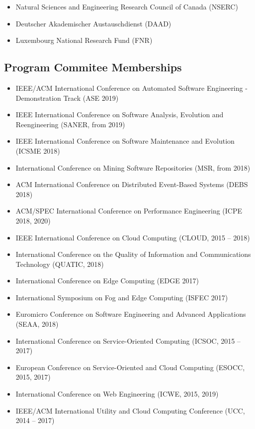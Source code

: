 \documentclass[paper=letter,fontsize=11pt]{scrartcl} %
\begin{document}
\begin{itemize}
  \item Natural Sciences and Engineering Research Council of Canada (NSERC)
	\item Deutscher Akademischer Austauschdienst (DAAD)
	\item Luxembourg National Research Fund (FNR)
\end{itemize}

\subsection*{Program Commitee Memberships}
\begin{itemize}
	\item IEEE/ACM International Conference on Automated Software Engineering - Demonstration Track (ASE 2019)
	\item IEEE International Conference on Software Analysis, Evolution and Reengineering (SANER, from 2019)
	\item IEEE International Conference on Software Maintenance and Evolution (ICSME 2018)
	\item International Conference on Mining Software Repositories (MSR, from 2018)
  \item ACM International Conference on Distributed Event-Based Systems (DEBS 2018)
	\item ACM/SPEC International Conference on Performance Engineering (ICPE 2018, 2020)
	\item IEEE International Conference on Cloud Computing (CLOUD, 2015 -- 2018)
	\item International Conference on the Quality of Information and Communications Technology (QUATIC, 2018)
	\item International Conference on Edge Computing (EDGE 2017)
  \item International Symposium on Fog and Edge Computing (ISFEC 2017)
	\item Euromicro Conference on Software Engineering and Advanced Applications (SEAA, 2018)
	\item International Conference on Service-Oriented Computing (ICSOC, 2015 -- 2017)
  \item European Conference on Service-Oriented and Cloud Computing (ESOCC, 2015, 2017)
  \item International Conference on Web Engineering (ICWE, 2015, 2019)
  \item IEEE/ACM International Utility and Cloud Computing Conference (UCC, 2014 -- 2017)

\end{itemize}
\end{document}
